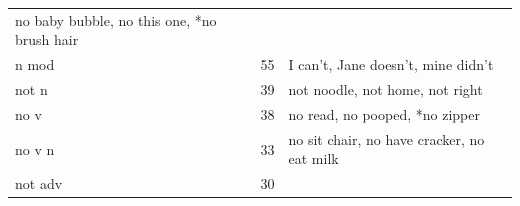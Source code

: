 \documentclass[man,floatsintext,draftall]{apa6}
\begin{document}
\begin{longtable}[]{@{}lll@{}}
\begin{minipage}[t]{0.47\columnwidth}
no baby bubble, no this one, *no brush hair\strut
\end{minipage}\tabularnewline
\begin{minipage}[t]{0.23\columnwidth}\raggedright\strut
n mod\strut
\end{minipage} & \begin{minipage}[t]{0.15\columnwidth}\raggedright\strut
55\strut
\end{minipage} & \begin{minipage}[t]{0.47\columnwidth}\raggedright\strut
I can't, Jane doesn't, mine didn't\strut
\end{minipage}\tabularnewline
\begin{minipage}[t]{0.23\columnwidth}\raggedright\strut
not n\strut
\end{minipage} & \begin{minipage}[t]{0.15\columnwidth}\raggedright\strut
39\strut
\end{minipage} & \begin{minipage}[t]{0.47\columnwidth}\raggedright\strut
not noodle, not home, not right\strut
\end{minipage}\tabularnewline
\begin{minipage}[t]{0.23\columnwidth}\raggedright\strut
no v\strut
\end{minipage} & \begin{minipage}[t]{0.15\columnwidth}\raggedright\strut
38\strut
\end{minipage} & \begin{minipage}[t]{0.47\columnwidth}\raggedright\strut
no read, no pooped, *no zipper\strut
\end{minipage}\tabularnewline
\begin{minipage}[t]{0.23\columnwidth}\raggedright\strut
no v n\strut
\end{minipage} & \begin{minipage}[t]{0.15\columnwidth}\raggedright\strut
33\strut
\end{minipage} & \begin{minipage}[t]{0.47\columnwidth}\raggedright\strut
no sit chair, no have cracker, no eat milk\strut
\end{minipage}\tabularnewline
\begin{minipage}[t]{0.23\columnwidth}\raggedright\strut
not adv\strut
\end{minipage} & \begin{minipage}[t]{0.15\columnwidth}\raggedright\strut
30\strut
\end{minipage} & \begin{minipage}[t]{0.47\columnwidth}\raggedright\strut

\end{minipage}
\end{longtable}
\end{document}
